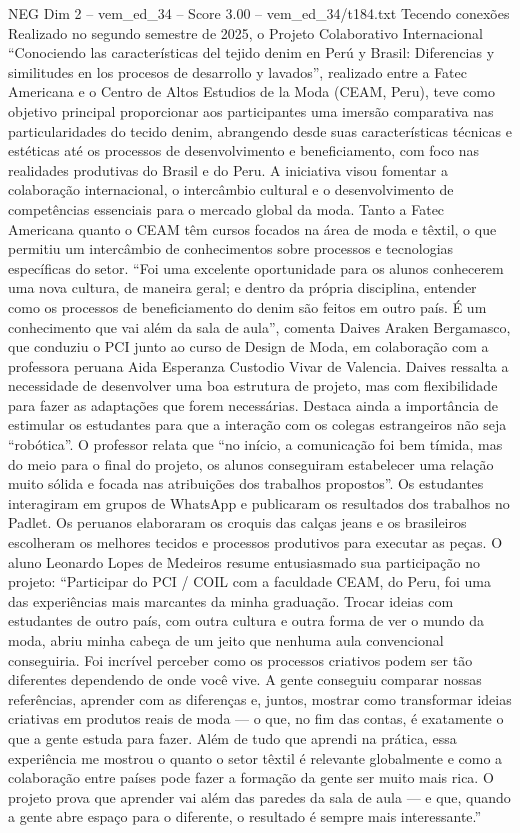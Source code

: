 \begin{textsample}{NEG Dim 2 – vem\_ed\_34 – Score 3.00 – vem\_ed\_34/t184.txt}  \label{ex:f2_neg_064}
Tecendo conexões Realizado no segundo semestre de 2025, o Projeto Colaborativo Internacional “Conociendo las características del tejido denim en Perú y Brasil: Diferencias y similitudes en los procesos de desarrollo y lavados”, realizado entre a Fatec Americana e o Centro de Altos Estudios de la Moda (CEAM, Peru), teve como objetivo principal proporcionar aos participantes uma imersão comparativa nas particularidades do tecido denim, abrangendo desde suas características técnicas e estéticas até os processos de desenvolvimento e beneficiamento, com foco nas realidades produtivas do Brasil e do Peru.
A iniciativa visou fomentar a colaboração internacional, o intercâmbio cultural e o desenvolvimento de competências essenciais para o mercado global da moda.
Tanto a Fatec Americana quanto o CEAM têm cursos focados na área de moda e têxtil, o que permitiu um intercâmbio de conhecimentos sobre processos e tecnologias específicas do setor. “Foi uma excelente oportunidade para os alunos conhecerem uma nova cultura, de maneira geral; e dentro da própria disciplina, entender como os processos de beneficiamento do denim são feitos em outro país.
É um conhecimento que vai além da sala de aula”, comenta Daives Araken Bergamasco, que conduziu o PCI junto ao curso de Design de Moda, em colaboração com a professora peruana Aida Esperanza Custodio Vivar de Valencia.
Daives ressalta a necessidade de desenvolver uma boa estrutura de projeto, mas com flexibilidade para fazer as adaptações que forem necessárias.
Destaca ainda a importância de estimular os estudantes para que a interação com os colegas estrangeiros não seja “robótica”.
O professor relata que “no início, a comunicação foi bem tímida, mas do meio para o final do projeto, os alunos conseguiram estabelecer uma relação muito sólida e focada nas atribuições dos trabalhos propostos”.
Os estudantes interagiram em grupos de WhatsApp e publicaram os resultados dos trabalhos no Padlet.
Os peruanos elaboraram os croquis das calças jeans e os brasileiros escolheram os melhores tecidos e processos produtivos para executar as peças.
O aluno Leonardo Lopes de Medeiros resume entusiasmado sua participação no projeto: “Participar do PCI / COIL com a faculdade CEAM, do Peru, foi uma das experiências mais marcantes da minha graduação.
Trocar ideias com estudantes de outro país, com outra cultura e outra forma de ver o mundo da moda, abriu minha cabeça de um jeito que nenhuma aula convencional conseguiria.
Foi incrível perceber como os processos criativos podem ser tão diferentes dependendo de onde você vive.
A gente conseguiu comparar nossas referências, aprender com as diferenças e, juntos, mostrar como transformar ideias criativas em produtos reais de moda — o que, no fim das contas, é exatamente o que a gente estuda para fazer.
Além de tudo que aprendi na prática, essa experiência me mostrou o quanto o setor têxtil é relevante globalmente e como a colaboração entre países pode fazer a formação da gente ser muito mais rica.
O projeto prova que aprender vai além das paredes da sala de aula — e que, quando a gente abre espaço para o diferente, o resultado é sempre mais interessante.”

\end{textsample}
